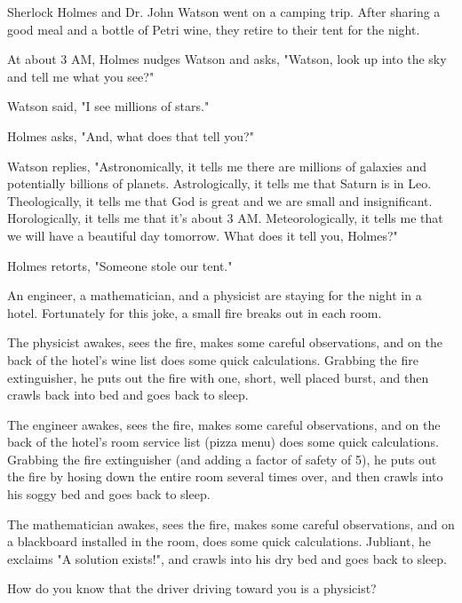 Sherlock Holmes and Dr. John Watson went on a camping trip. After sharing a good meal and a bottle of Petri wine, they retire to their tent for the night.

At about 3 AM, Holmes nudges Watson and asks, "Watson, look up into the sky and tell me what you see?"

Watson said, "I see millions of stars."

Holmes asks, "And, what does that tell you?"

Watson replies, "Astronomically, it tells me there are millions of galaxies and potentially billions of planets. Astrologically, it tells me that Saturn is in Leo. Theologically, it tells me that God is great and we are small and insignificant. Horologically, it tells me that it's about 3 AM. Meteorologically, it tells me that we will have a beautiful day tomorrow. What does it tell you, Holmes?"

Holmes retorts, "Someone stole our tent." 
	\begin{center}\underline{\hspace{5 cm}}\end{center}

An engineer, a mathematician, and a physicist are staying for the night in a hotel. Fortunately for this joke, a small fire breaks out in each room.

The physicist awakes, sees the fire, makes some careful observations, and on the back of the hotel's wine list does some quick calculations. Grabbing the fire extinguisher, he puts out the fire with one, short, well placed burst, and then crawls back into bed and goes back to sleep.

The engineer awakes, sees the fire, makes some careful observations, and on the back of the hotel's room service list (pizza menu) does some quick calculations. Grabbing the fire extinguisher (and adding a factor of safety of 5), he puts out the fire by hosing down the entire room several times over, and then crawls into his soggy bed and goes back to sleep.

The mathematician awakes, sees the fire, makes some careful observations, and on a blackboard installed in the room, does some quick calculations. Jubliant, he exclaims "A solution exists!", and crawls into his dry bed and goes back to sleep.
	\begin{center}\underline{\hspace{5 cm}}\end{center}

How do you know that the driver driving toward you is a physicist?

